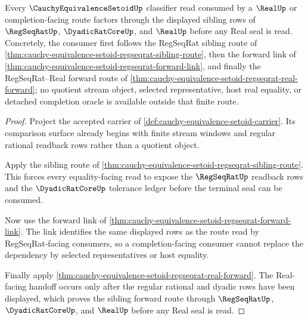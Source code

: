 \begin{theorem}
\label{thm:cauchy-equivalence-setoid-regseqrat-sibling-forward-route}
Every $\CauchyEquivalenceSetoidUp$ classifier read consumed by a $\RealUp$ or completion-facing route factors through the displayed sibling rows of $\RegSeqRatUp$, $\DyadicRatCoreUp$, and $\RealUp$ before any Real seal is read. Concretely, the consumer first follows the RegSeqRat sibling route of \autoref{thm:cauchy-equivalence-setoid-regseqrat-sibling-route}, then the forward link of \autoref{thm:cauchy-equivalence-setoid-regseqrat-forward-link}, and finally the RegSeqRat--Real forward route of \autoref{thm:cauchy-equivalence-setoid-regseqrat-real-forward}; no quotient stream object, selected representative, host real equality, or detached completion oracle is available outside that finite route.
\end{theorem}
\begin{proof}
Project the accepted carrier of \autoref{def:cauchy-equivalence-setoid-carrier}. Its comparison surface already begins with finite stream windows and regular rational readback rows rather than a quotient object.

Apply the sibling route of \autoref{thm:cauchy-equivalence-setoid-regseqrat-sibling-route}. This forces every equality-facing read to expose the $\RegSeqRatUp$ readback rows and the $\DyadicRatCoreUp$ tolerance ledger before the terminal seal can be consumed.

Now use the forward link of \autoref{thm:cauchy-equivalence-setoid-regseqrat-forward-link}. The link identifies the same displayed rows as the route read by RegSeqRat-facing consumers, so a completion-facing consumer cannot replace the dependency by selected representatives or host equality.

Finally apply \autoref{thm:cauchy-equivalence-setoid-regseqrat-real-forward}. The Real-facing handoff occurs only after the regular rational and dyadic rows have been displayed, which proves the sibling forward route through $\RegSeqRatUp$, $\DyadicRatCoreUp$, and $\RealUp$ before any Real seal is read.
\end{proof}
